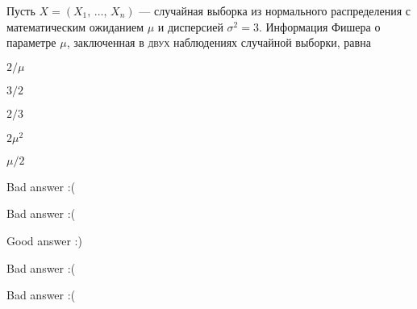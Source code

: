 
\begin{question}
Пусть \(X = (X_1, \, \ldots, \, X_n)\) --- случайная выборка из
нормального распределения с математическим ожиданием \(\mu\) и
дисперсией \(\sigma^2 = 3\). Информация Фишера о параметре \(\mu\),
заключенная в \textsc{двух} наблюдениях случайной выборки, равна
\begin{answerlist}
  \item \(2 / \mu\)
  \item \(3 / 2\)
  \item \(2 / 3\)
  \item \(2 \mu^2\)
  \item \(\mu / 2\)
\end{answerlist}
\end{question}

\begin{solution}
\begin{answerlist}
  \item Bad answer :(
  \item Bad answer :(
  \item Good answer :)
  \item Bad answer :(
  \item Bad answer :(
\end{answerlist}
\end{solution}

